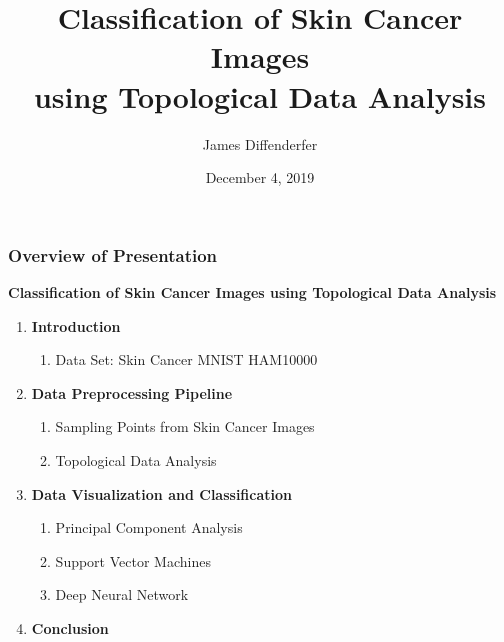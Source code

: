 \documentclass[aspectratio=169]{beamer}
\title{Classification of Skin Cancer Images\\ using Topological Data Analysis}
\date{December 4, 2019}
\author[Diffenderfer]{James Diffenderfer}
\begin{document}
\nobibliography*


\begin{frame}
\titlepage
\end{frame}


\begin{frame}
\frametitle{Overview of Presentation}
\justifying
{\bfseries \textcolor{UF_dark_blue}{Classification of Skin Cancer Images using Topological Data Analysis}}
\begin{enumerate}
	\item {\bfseries \textcolor{UF_dark_blue}{Introduction}}
	\begin{enumerate}
		\item Data Set: Skin Cancer MNIST HAM10000
	\end{enumerate}
	\item {\bfseries \textcolor{UF_dark_blue}{Data Preprocessing Pipeline}}
	\begin{enumerate}
		\item Sampling Points from Skin Cancer Images
		\item Topological Data Analysis
	\end{enumerate}
	\item {\bfseries \textcolor{UF_dark_blue}{Data Visualization and Classification}}
	\begin{enumerate}
		\item Principal Component Analysis
		\item Support Vector Machines
		\item Deep Neural Network
	\end{enumerate}
    \item {\bfseries \textcolor{UF_dark_blue}{Conclusion}}
\end{enumerate}
\end{frame}
\end{document}
